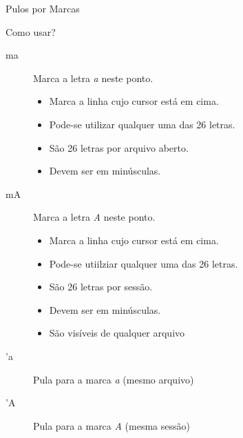 \begin{frame}{Pulos por Marcas}
\begin{block}{Como usar?}
	\begin{description}
		\item[ma] Marca a letra \textit{a} neste ponto.
		\begin{itemize}
			\item Marca a linha cujo cursor está em cima.
			\item Pode-se utilizar qualquer uma das 26 letras.
			\item São 26 letras por arquivo aberto.
			\item Devem ser em minúsculas.
		\end{itemize}
		\item[mA] Marca a letra \textit{A} neste ponto.
		\begin{itemize}
			\item Marca a linha cujo cursor está em cima.
			\item Pode-se utiilziar qualquer uma das 26 letras.
			\item São 26 letras por sessão.
			\item Devem ser em minúsculas.
			\item São visíveis de qualquer arquivo
		\end{itemize}
		\item['a] Pula para a marca \textit{a} (mesmo arquivo)
		\item['A] Pula para a marca \textit{A} (mesma sessão)
	\end{description}
\end{block}
\end{frame}
